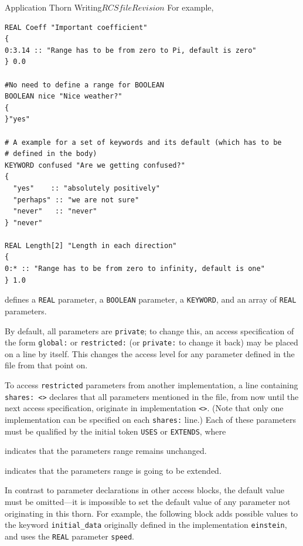 \begin{cactuspart}{Application Thorn Writing}{$RCSfile$}{$Revision$}
For example,
\begin{verbatim}
REAL Coeff "Important coefficient"
{
0:3.14 :: "Range has to be from zero to Pi, default is zero"
} 0.0

#No need to define a range for BOOLEAN
BOOLEAN nice "Nice weather?"
{
}"yes"

# A example for a set of keywords and its default (which has to be
# defined in the body)
KEYWORD confused "Are we getting confused?"
{
  "yes"    :: "absolutely positively"
  "perhaps" :: "we are not sure"
  "never"   :: "never"
} "never"

REAL Length[2] "Length in each direction"
{
0:* :: "Range has to be from zero to infinity, default is one"
} 1.0

\end{verbatim}
defines a \texttt{REAL} parameter, a \texttt{BOOLEAN} parameter, a \texttt{KEYWORD},
and an array of \texttt{REAL} parameters.

By default, all parameters are \texttt{private}; to change this, an access
specification of the form \texttt{global:} or \texttt{restricted:} (or
\texttt{private:} to change it back) may be placed on a line by itself.  This
changes the access level for any parameter defined in the file from that point on.

To access \texttt{restricted} parameters from another implementation, a line
containing \texttt{shares: <>} declares that all parameters mentioned in
the file, from now until the next access specification, originate in
implementation \texttt{<>}. (Note that only one implementation can be
specified on each \texttt{shares:} line.)  Each of these parameters must be qualified by the initial token \texttt{USES} or \texttt{EXTENDS}, where
\begin{Lentry}
\item[\texttt{USES}] indicates that the parameters range remains unchanged.
\item[\texttt{EXTENDS}] indicates that the parameters range is going to be extended.
\end{Lentry}

In contrast to parameter declarations in other access blocks, the default
value must be omitted---it is impossible to set the default value of any
parameter not originating in this thorn.
For example, the following block adds possible values to the keyword
\texttt{initial\_data} originally defined in the implementation \texttt{einstein},
and uses the \texttt{REAL} parameter \texttt{speed}.


\end{cactuspart}
